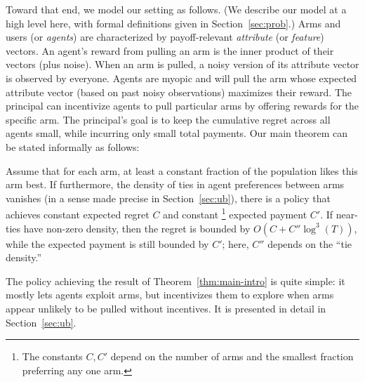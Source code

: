Toward that end, we model our setting as follows.
(We describe our model at a high level here,
with formal definitions given in Section~\ref{sec:prob}.)
Arms and users (or \emph{agents}) are characterized by payoff-relevant
\emph{attribute} (or \emph{feature}) vectors.
An agent's reward from pulling an arm is the inner product of their
vectors (plus noise).
When an arm is pulled, a noisy version of its attribute vector is
observed by everyone.
Agents are myopic and will pull the arm whose expected attribute
vector (based on past noisy observations) maximizes their reward.
The principal can incentivize agents to pull particular arms by
offering rewards for the specific arm.
The principal's goal is to keep the cumulative regret across all
agents small, while incurring only small total payments.
Our main theorem can be stated informally as follows:

\begin{theorem} \label{thm:main-intro}
Assume that for each arm, at least a constant fraction of the
population likes this arm best.
If furthermore, the density of ties in agent preferences between arms
vanishes (in a sense made precise in Section~\ref{sec:ub}),
there is a policy that achieves constant
expected regret $C$ and constant%
\footnote{The constants $C,C'$ depend on the number of arms and the
  smallest fraction preferring any one arm.} expected payment $C'$.
If near-ties have non-zero density,
then the regret is bounded by $O(C + C'' \log^3(T))$,
while the expected payment is still bounded by $C'$;
here, $C''$ depends on the ``tie density.''
\end{theorem}

The policy achieving the result of Theorem~\ref{thm:main-intro} is
quite simple: it mostly lets agents exploit arms, but incentivizes
them to explore when arms appear unlikely to be pulled without incentives.
It is presented in detail in Section~\ref{sec:ub}.

